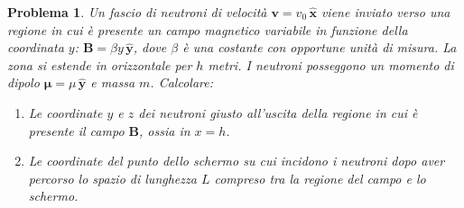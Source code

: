 \documentclass[a4paper,oneside]{article}
\newtheorem{problema}{Problema}
\renewcommand{\vec}[1]{\mathbf{#1}}
\renewcommand{\hat}[1]{\widehat{\mathbf{#1}}}
\begin{document}
\begin{problema}
	Un fascio di neutroni di velocità $\vec{v} = v_{0}\,\hat{x}$ 
	viene inviato verso una regione in cui è presente un campo 
	magnetico variabile in funzione della coordinata $y$: 
	$\vec{B} = \beta y\,\hat{y}$, dove $\beta$ è una 
	costante con  opportune unità di misura. La zona si 
	estende in orizzontale per $h$ metri. I neutroni 
	posseggono un momento di dipolo $\vec{\mu} 
	= \mu\,\hat{y}$ e massa $m$. Calcolare:
	\begin{enumerate}
		\item Le coordinate $y$ e $z$ dei neutroni 
		giusto all'uscita della regione in cui è presente 
		il campo $\vec{B}$, ossia in $x=h$.
		\item Le coordinate del punto dello schermo 
		su cui incidono i neutroni dopo aver percorso lo 
		spazio di lunghezza $L$ compreso tra la regione 
		del campo e lo schermo.
	\end{enumerate}
\end{problema}
\end{document}
